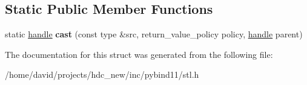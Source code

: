 \subsection*{Static Public Member Functions}
\begin{DoxyCompactItemize}
\item 
static \hyperlink{classhandle}{handle} {\bfseries cast} (const type \&src, return\+\_\+value\+\_\+policy policy, \hyperlink{classhandle}{handle} parent)\hypertarget{structmap__caster_a22f4933aa225559e1179f3607c45257d}{}\label{structmap__caster_a22f4933aa225559e1179f3607c45257d}

\end{DoxyCompactItemize}


The documentation for this struct was generated from the following file\+:\begin{DoxyCompactItemize}
\item 
/home/david/projects/hdc\+\_\+new/inc/pybind11/stl.\+h\end{DoxyCompactItemize}
